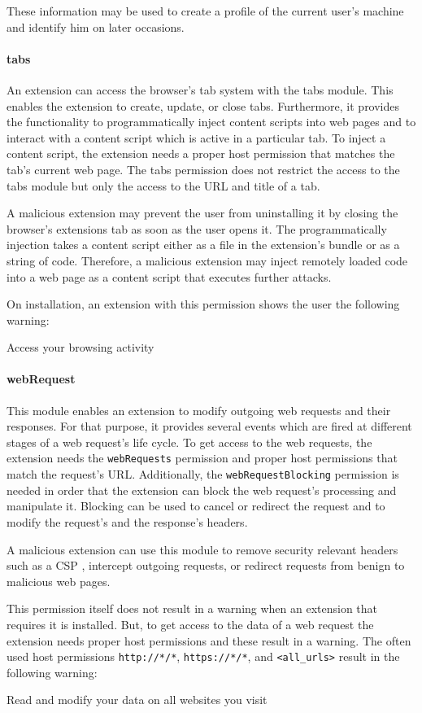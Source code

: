 	These information may be used to create a profile of the current user's machine and identify him on later occasions.
	
\paragraph{tabs}
	An extension can access the browser's tab system with the tabs module. This enables the extension to create, update, or close tabs. Furthermore, it provides the functionality to programmatically inject content scripts into web pages and to interact with a content script which is active in a particular tab. To inject a content script, the extension needs a proper host permission that matches the tab's current web page. The tabs permission does not restrict the access to the tabs module but only the access to the URL and title of a tab. 
	
	A malicious extension may prevent the user from uninstalling it by closing the browser's extensions tab as soon as the user opens it. The programmatically injection takes a content script either as a file in the extension's bundle or as a string of code. Therefore, a malicious extension may inject remotely loaded code into a web page as a content script that executes further attacks.
	
	On installation, an extension with this permission shows the user the following warning:
	\begin{permissionwarning}
		Access your browsing activity 
	\end{permissionwarning}		
	
\paragraph{webRequest}

	This module enables an extension to modify outgoing web requests and their responses. For that purpose, it provides several events which are fired at different stages of a web request's life cycle. To get access to the web requests, the extension needs the \texttt{webRequests} permission and proper host permissions that match the request's URL. Additionally, the \texttt{webRequestBlocking} permission is needed in order that the extension can block the web request's processing and manipulate it. Blocking can be used to cancel or redirect the request and to modify the request's and the response's headers. 
	
	A malicious extension can use this module to remove security relevant headers such as a CSP , intercept outgoing requests, or redirect requests from benign to malicious web pages.
	
	This permission itself does not result in a warning when an extension that requires it is installed. But, to get access to the data of a web request the extension needs proper host permissions and these result in a warning. The often used host permissions \texttt{http://*/*}, \texttt{https://*/*}, and \texttt{<all\_urls>} result in the following warning:
	\begin{permissionwarning}
		Read and modify your data on all websites you visit 
	\end{permissionwarning}
	
